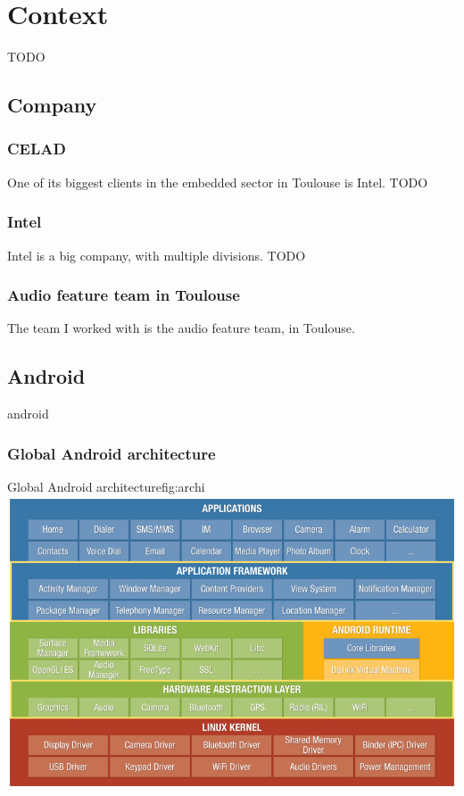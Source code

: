 \chapter{Context}\label{chap:context}

\begin{sectionIntro}
    TODO
\end{sectionIntro}

\section{Company}

\subsection{CELAD}
One of its biggest clients in the embedded sector in Toulouse is Intel.
TODO

\subsection{Intel}
Intel is a big company, with multiple divisions.
TODO

\subsection{Audio feature team in Toulouse}
The team I worked with is the audio feature team, in Toulouse.

\section{Android}
\gls{android}

\subsection{Global Android architecture}

\begin{figureGraphics}{Global Android architecture}{fig:archi}
\includegraphics[width=\textwidth]{./src/img/android-archi.jpg}
\end{figureGraphics}

